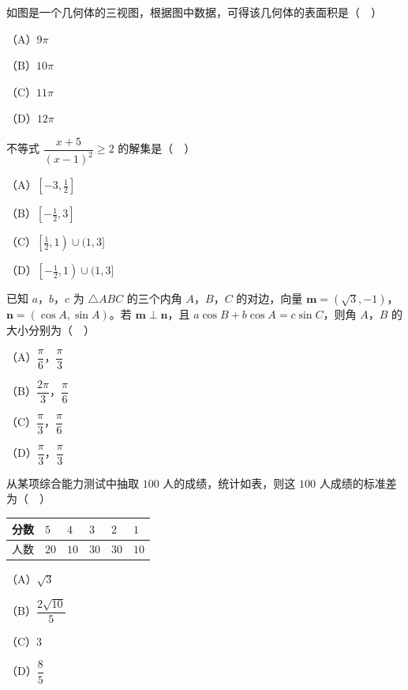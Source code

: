 \begingroup
\renewenvironment{question}{\Needspace{0.5\textheight}}{}
\begin{question}
如图是一个几何体的三视图，根据图中数据，可得该几何体的表面积是（　）
\nopagebreak[4]
\begin{center}\end{center}
\nopagebreak[4]
（A）$9\pi$

（B）$10\pi$

（C）$11\pi$

（D）$12\pi$

\end{question}
\endgroup
\begingroup
\renewenvironment{question}{\Needspace{0.3\textheight}}{}
\begin{question}
不等式 $\dfrac{x+5}{(x-1)^2}\geqslant2$ 的解集是（　）

（A）$\left[-3,\frac12\right]$

（B）$\left[-\frac12,3\right]$

（C）$\left[\frac12,1\right)\cup(1,3]$

（D）$\left[-\frac12,1\right)\cup(1,3]$

\end{question}
\endgroup
\begin{question}
已知 $a$，$b$，$c$ 为 $\triangle ABC$ 的三个内角 $A$，$B$，$C$ 的对边，向量 $\boldsymbol m=(\sqrt3,-1)$，$\boldsymbol n=(\cos A,\sin A)$。若 $\boldsymbol m\perp\boldsymbol n$，且 $a\cos B+b\cos A=c\sin C$，则角 $A$，$B$ 的大小分别为（　）

（A）$\dfrac{\pi}{6}$，$\dfrac{\pi}{3}$

（B）$\dfrac{2\pi}{3}$，$\dfrac{\pi}{6}$

（C）$\dfrac{\pi}{3}$，$\dfrac{\pi}{6}$

（D）$\dfrac{\pi}{3}$，$\dfrac{\pi}{3}$

\end{question}
\begin{question}
从某项综合能力测试中抽取 $100$ 人的成绩，统计如表，则这 $100$ 人成绩的标准差为（　）

\begin{center}
\begin{tabular}{llllll}
\toprule
分数 & $5$ & $4$ & $3$ & $2$ & $1$ \\
\midrule
人数 & $20$ & $10$ & $30$ & $30$ & $10$ \\
\bottomrule
\end{tabular}
\end{center}

（A）$\sqrt3$

（B）$\dfrac{2\sqrt{10}}5$

（C）$3$

（D）$\dfrac85$

\end{question}
